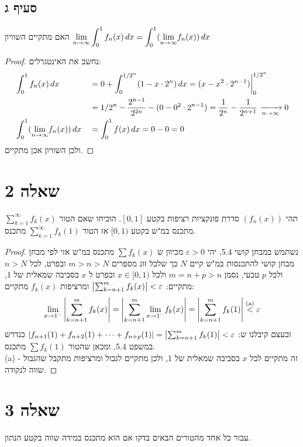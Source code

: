 \documentclass{article}
\begin{document}
	\subsection*{סעיף ג}
	האם מתקיים השוויון $\displaystyle{\lim_{n \to \infty}} \int_0^1 f_n(x) \, dx = \int_0^1 (\displaystyle{\lim_{n \to \infty}} f_n(x)) \, dx$
	\begin{proof}
		נחשב את האינטגרלים:
		\begin{alignat*}{2}
			&\int_0^1 f_n(x) \, dx
			&&= 0 + \int_0^{1/2^n} (1 - x \cdot 2^n) \, dx
			= (x - x^2 \cdot 2^{n-1}) \biggr|_0^{1/2^n} \\
			& &&=  1/2^n - \frac{2^{n-1}}{2^{2n}} - (0 - 0^2 \cdot 2^{n-1})
			= \frac{1}{2^n} - \frac{1}{2^{n+1}}
			\xrightarrow[n \to \infty]{} 0 \\
			&\int_0^1 (\displaystyle{\lim_{n \to \infty}} f_n(x)) \, dx
			&&= \int_0^1 f(x) \, dx = 0 - 0 = 0
		\end{alignat*}
		ולכן השוויון אכן מתקיים.

	\end{proof}

	\section*{שאלה 2}
	תהי $(f_n(x))$ סדרת פונקציות רציפות בקטע $[0, 1]$.
	הוכיחו שאם הטור $\sum_{k=1}^\infty f_k(x)$ מתכנס במ"ש בקטע $[0,1)$ אז הטור $\sum_{k=1}^\infty f_k(1)$ מתכנס.
	\begin{proof}
		נשתמש במבחן קושי 5.4,
		יהי $\varepsilon > 0$ מכיוון ש $\sum f_k(x)$ מתכנס במ"ש אזי לפי מבחן מבחן קושי להתכנסות במ"ש קיים $N$ כך שלכל זוג מספרים $m > n > N$
		ובפרט, לכל $n > N$ ולכל $p$ טבעי, נסמן $m = n+p > n$ ולכל $x \in [0, 1)$ ובפרט ל $x$ בסביבה שמאלית של 1,
		מתקיים: $\left| \sum_{k=n+1}^m f_k(x) \right| < \varepsilon$
		ומרציפות $f_k(x)$ מתקיים:
		\[
			\displaystyle{\lim_{x \to 1^-}} \left| \sum_{k=n+1}^m f_k(x) \right| =
			\left| \sum_{k=n+1}^m \displaystyle{\lim_{x \to 1^-}}  f_k(x) \right| =
			\left| \sum_{k=n+1}^m f_k(1) \right| \overset{\text{(a)}}< \varepsilon
		\]
		ובעצם קיבלנו ש: $\left| f_{n+1}(1) + f_{n+2}(1) + \cdots + f_{n+p}(1) \right| = \left| \sum_{k=n+1}^m f_k(1) \right| < \varepsilon$
		כנדרש במשפט 5.4, ומכאן שהטור $\sum f_k(1)$ מתכנס. \\
		(a) - זה מתקיים לכל $x$ בסביבה שמאלית של 1, ולכן מתקיים לגבול ומרציפות מתקבל שהגבול שווה לנקודה.

	\end{proof}

	\section*{שאלה 3}
	עבור כל אחד מהטורים הבאים בדקו אם הוא מתכנס במידה שווה בקטע הנתון.
\end{document}

